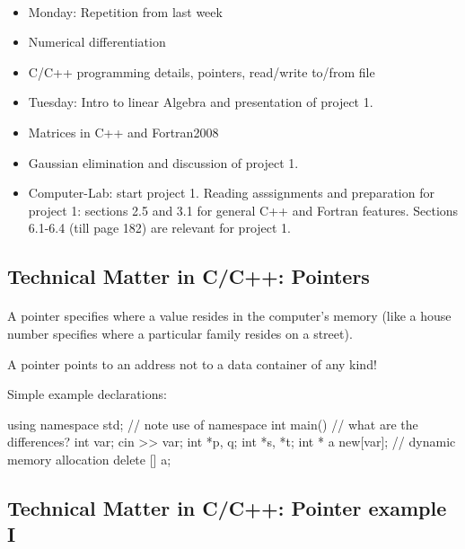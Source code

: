 \documentclass[%
twoside,                 %
final,                   %
10pt]{article}
\newenvironment{paragraphadmon}[1][]{\paragraph{#1}}{}
\begin{document}
\begin{paragraphadmon}[]
\begin{itemize}
  \item Monday: Repetition from last week

  \item Numerical differentiation

  \item C/C++ programming details, pointers, read/write to/from file

  \item Tuesday: Intro to linear Algebra and presentation of project 1.

  \item Matrices in C++ and Fortran2008

  \item Gaussian elimination and discussion of project 1.

  \item Computer-Lab: start project 1. Reading asssignments and preparation for project 1: sections 2.5 and 3.1 for general C++ and Fortran features. Sections 6.1-6.4 (till page 182) are relevant for project 1.
\end{itemize}

\noindent
\end{paragraphadmon}



\subsection{Technical Matter in C/C++: Pointers}


\begin{paragraphadmon}[]
A pointer specifies where a value resides in the computer's memory (like a house number specifies where a particular family resides on a street).

A pointer points to an address not to a data container of any kind!

Simple example declarations:

\bcppcod
  using namespace std; // note use of namespace
  int main()
 {
   // what are the differences?
   int var;
   cin >> var;
   int *p, q;
   int *s, *t;
   int * a new[var];    // dynamic memory allocation
   delete [] a;
}
\ecppcod
\end{paragraphadmon}



\subsection{Technical Matter in C/C++: Pointer example I}
\end{document}
